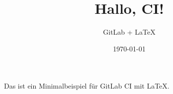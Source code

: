 \documentclass[a4paper,11pt]{article}
\title{Hallo, CI!}
\author{GitLab + LaTeX}
\date{\today}
\begin{document}
\maketitle
Das ist ein Minimalbeispiel für GitLab CI mit \LaTeX.
\end{document}
